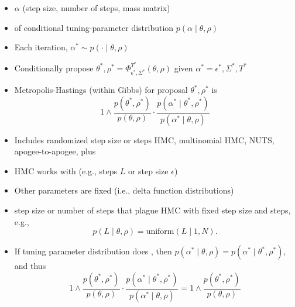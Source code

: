 \documentclass[10pt]{report}
\begin{document}
\begin{itemize}
\item {} $\alpha$ (step
  size, number of steps, mass matrix)
\item {} of conditional tuning-parameter distribution $p(\alpha \mid \theta, \rho)$
\item Each iteration,  $\alpha^* \sim p( \cdot \mid \theta,
  \rho)$
\item Conditionally propose $\theta^*, \rho^* = \Phi^{T^*}_{\epsilon^*,
    \Sigma^*}(\theta, \rho)$ given $\alpha^* = \epsilon^*,
  \Sigma^*, T^*$
\item Metropolis-Hastings (within Gibbs)  for proposal $\theta^*,
  \rho^*$ is
  $$
  1 \wedge
  \frac{p(\theta^*, \rho^*)}
  {p(\theta, \rho)}
  \cdot
  \frac{p(\alpha^* \mid \theta^*, \rho^*)}
       {p(\alpha^* \mid \theta, \rho)}
       $$
\item Includes randomized step size or steps HMC, multinomial HMC,
  NUTS, apogee-to-apogee, plus 
\end{itemize}

\begin{itemize}
\item HMC works with  (e.g., steps $L$ or
  step size $\epsilon$)
\item Other parameters are fixed (i.e., delta function distributions)
\item {} step size or number of steps  that plague HMC with fixed step size and steps, e.g.,
  $$p(L \mid \theta, \rho) = \textrm{uniform}(L \mid 1, N).$$
\item If tuning parameter distribution does , then $p(\alpha^* \mid \theta, \rho) = p(\alpha^* \mid \theta^*,
  \rho^*)$, and thus
  $$
  1 \wedge
  \frac{p(\theta^*, \rho^*)}
       {p(\theta, \rho)}
  \cdot
  \frac{p(\alpha^* \mid \theta^*, \rho^*)}
       {p(\alpha^* \mid \theta, \rho)}
       =
       1 \wedge
       \frac{p(\theta^*, \rho^*)}{p(\theta, \rho)}
  $$       
\end{itemize}
\end{document}
